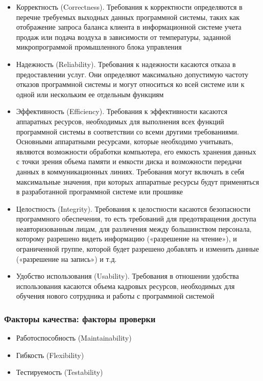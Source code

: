 \documentclass{../industrial-development}
\begin{document}
 	 \begin{itemize}
\item Корректность (Correctness). Требования к корректности определяются в перечне требуемых выходных данных программной системы, таких как отображение запроса баланса клиента в информационной системе учета продаж или подача воздуха в зависимости от температуры, заданной микропрограммой промышленного блока управления
\item Надежность (Reliability). Требования к надежности касаются отказа в предоставлении услуг. Они определяют максимально допустимую частоту отказов программной системы и могут относиться ко всей системе или к одной или нескольким ее отдельным функциям
\item Эффективность (Efficiency). Требования к эффективности касаются аппаратных ресурсов, необходимых для выполнения всех функций программной системы в соответствии со всеми другими требованиями. Основными аппаратными ресурсами, которые необходимо учитывать, являются возможности обработки компьютера, его емкость хранения данных с точки зрения объема памяти и емкости диска и возможности передачи данных в коммуникационных линиях. Требования могут включать в себя максимальные значения, при которых аппаратные ресурсы будут применяться в разработанной программной системе или прошивке
\item Целостность (Integrity). Требования к целостности касаются безопасности программного обеспечения, то есть требований для предотвращения доступа неавторизованным лицам, для различения между большинством персонала, которому разрешено видеть информацию («разрешение на чтение»), и ограниченной группе, которой будет разрешено добавлять и изменить данные («разрешение на запись») и т.д.
\item Удобство использования (Usability). Требования в отношении удобства использования касаются объема кадровых ресурсов, необходимых для обучения нового сотрудника и работы с программной системой~\cite[с.~38--41]{SQA-Galin}
  	\end{itemize}



\begin{frame} \frametitle{Факторы качества: факторы проверки}
 	 \begin{itemize}
\item Работоспособность (Maintainability)
\item Гибкость (Flexibility)
\item Тестируемость (Testability)
  	\end{itemize}
\end{frame}
\end{document}
